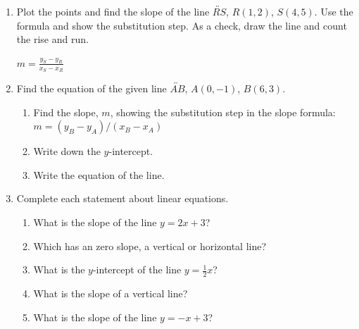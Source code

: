 \begin{enumerate}
\item Plot the points and find the slope of the line $\overleftrightarrow{RS}$, $R(1,2)$, $S(4,5)$. Use the formula and show the substitution step. As a check, draw the line and count the rise and run.
\begin{multicols}{2}
  $\displaystyle m = \frac{y_S - y_R}{x_S - x_R}$
    \vspace{2cm}
    \begin{flushright}
    \end{flushright}
\end{multicols}

\item Find the equation of the given line $\overleftrightarrow{AB}$, $A(0,-1)$, $B(6,3)$.
\begin{multicols}{2}
    \begin{enumerate}[itemsep=1.2cm]
      \item Find the slope, $m$, showing the substitution step in the slope formula: \\[0.25cm]
      $\displaystyle m = (y_B - y_A)/(x_B - x_A)$
      \item Write down the $y$-intercept.
      \item Write the equation of the line.
      \end{enumerate}
    \begin{flushright}
    \end{flushright}
\end{multicols}

\item Complete each statement about linear equations.
\begin{enumerate}[itemsep=0.5cm]
  \item What is the slope of the line $y = 2x + 3$?
  \item Which has an zero slope, a vertical or horizontal line?
  \item What is the $y$-intercept of the line $y = \frac{1}{2}x$?
  \item What is the slope of a vertical line?
  \item What is the slope of the line $y = -x + 3$?
\end{enumerate}


\end{enumerate}
